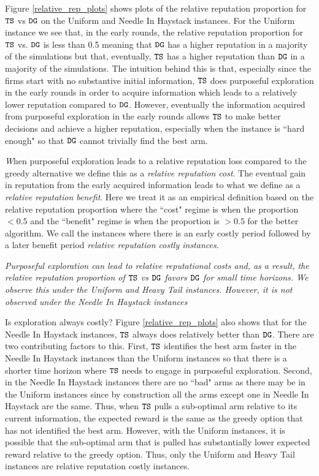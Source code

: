 \documentclass[../competing_bandits.tex]{subfiles}
\begin{document}
Figure \ref{relative_rep_plots} shows plots of the relative reputation proportion for $\mathtt{TS}$ vs $\mathtt{DG}$ on the Uniform and Needle In Haystack instances. For the Uniform instance we see that, in the early rounds, the relative reputation proportion for $\mathtt{TS}$  vs. $\mathtt{DG}$ is less than 0.5 meaning that $\mathtt{DG}$ has a higher reputation in a majority of the simulations but that, eventually, $\mathtt{TS}$ has a higher reputation than $\mathtt{DG}$ in a majority of the simulations. The intuition behind this is that, especially since the firms start with no substantive initial information, $\mathtt{TS}$ does purposeful exploration in the early rounds in order to acquire information which leads to a relatively lower reputation compared to $\mathtt{DG}$. However, eventually the information acquired from purposeful exploration in the early rounds allows $\mathtt{TS}$ to make better decisions and achieve a higher reputation, especially when the instance is ``hard enough" so that $\mathtt{DG}$ cannot trivially find the best arm.


\begin{definition}
\textit When purposeful exploration leads to a relative reputation loss compared to the greedy alternative we define this as a \textit{relative reputation cost}. The eventual gain in reputation from the early acquired information leads to what we define as a \textit{relative reputation benefit}. Here we treat it as an empirical definition based on the relative reputation proportion where the ``cost" regime is when the proportion $< 0.5$ and the ``benefit" regime is when the proportion is $> 0.5$ for the better algorithm. We call the instances where there is an early costly period followed by a later benefit period \textit{relative reputation costly instances}.
\end{definition}

\begin{finding}
\textit{Purposeful exploration can lead to relative reputational costs and, as a result, the relative reputation proportion of $\mathtt{TS}$ vs $\mathtt{DG}$ favors $\mathtt{DG}$ for small time horizons. We observe this under the Uniform and Heavy Tail instances. However, it is not observed under the Needle In Haystack instances}
\end{finding}

Is exploration always costly? Figure \ref{relative_rep_plots} also shows that for the Needle In Haystack instances, $\mathtt{TS}$ always does relatively better than $\mathtt{DG}$. There are two contributing factors to this. First, $\mathtt{TS}$ identifies the best arm faster in the Needle In Haystack instances than the Uniform instances so that there is a shorter time horizon where $\mathtt{TS}$ needs to engage in purposeful exploration. Second, in the Needle In Haystack instances there are no ``bad" arms as there may be in the Uniform instances since by construction all the arms except one in Needle In Haystack are the same. Thus, when $\mathtt{TS}$ pulls a sub-optimal arm relative to its current information, the expected reward is the same as the greedy option that has not identified the best arm. However, with the Uniform instances, it is possible that the sub-optimal arm that is pulled has substantially lower expected reward relative to the greedy option. Thus, only the Uniform and Heavy Tail instances are relative reputation costly instances.
\end{document}
